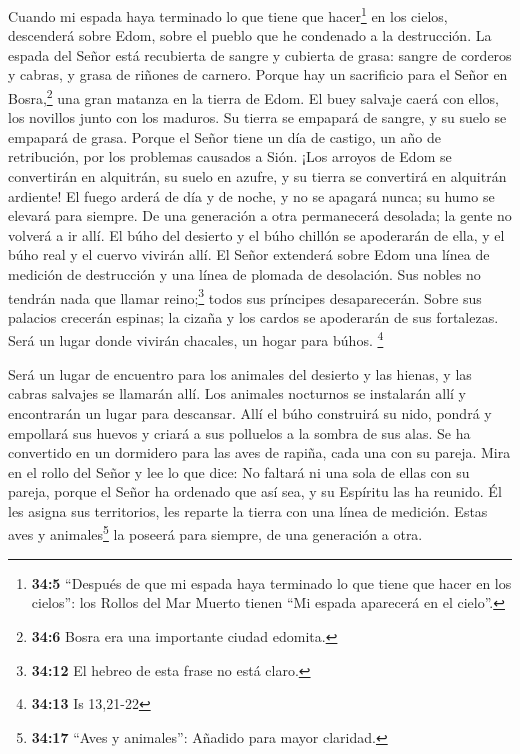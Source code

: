  Cuando mi espada haya terminado lo que tiene que
hacer\footnote{\textbf{34:5} ``Después de que mi espada haya terminado
  lo que tiene que hacer en los cielos'': los Rollos del Mar Muerto
  tienen ``Mi espada aparecerá en el cielo''.} en los cielos, descenderá
sobre Edom, sobre el pueblo que he condenado a la destrucción.
 La espada del Señor está recubierta de sangre y cubierta
de grasa: sangre de corderos y cabras, y grasa de riñones de carnero.
Porque hay un sacrificio para el Señor en Bosra,\footnote{\textbf{34:6}
  Bosra era una importante ciudad edomita.} una gran matanza en la
tierra de Edom.  El buey salvaje caerá con ellos, los
novillos junto con los maduros. Su tierra se empapará de sangre, y su
suelo se empapará de grasa.  Porque el Señor tiene un día
de castigo, un año de retribución, por los problemas causados a Sión.
 ¡Los arroyos de Edom se convertirán en alquitrán, su
suelo en azufre, y su tierra se convertirá en alquitrán ardiente!
 El fuego arderá de día y de noche, y no se apagará
nunca; su humo se elevará para siempre. De una generación a otra
permanecerá desolada; la gente no volverá a ir allí.  El
búho del desierto y el búho chillón se apoderarán de ella, y el búho
real y el cuervo vivirán allí. El Señor extenderá sobre Edom una línea
de medición de destrucción y una línea de plomada de desolación.
 Sus nobles no tendrán nada que llamar reino;\footnote{\textbf{34:12}
  El hebreo de esta frase no está claro.} todos sus príncipes
desaparecerán.  Sobre sus palacios crecerán espinas; la
cizaña y los cardos se apoderarán de sus fortalezas. Será un lugar donde
vivirán chacales, un hogar para búhos. \footnote{\textbf{34:13} Is
  13,21-22}

 Será un lugar de encuentro para los animales del
desierto y las hienas, y las cabras salvajes se llamarán allí. Los
animales nocturnos se instalarán allí y encontrarán un lugar para
descansar.  Allí el búho construirá su nido, pondrá y
empollará sus huevos y criará a sus polluelos a la sombra de sus alas.
Se ha convertido en un dormidero para las aves de rapiña, cada una con
su pareja.  Mira en el rollo del Señor y lee lo que dice:
No faltará ni una sola de ellas con su pareja, porque el Señor ha
ordenado que así sea, y su Espíritu las ha reunido.  Él
les asigna sus territorios, les reparte la tierra con una línea de
medición. Estas aves y animales\footnote{\textbf{34:17} ``Aves y
  animales'': Añadido para mayor claridad.} la poseerá para siempre, de
una generación a otra.

